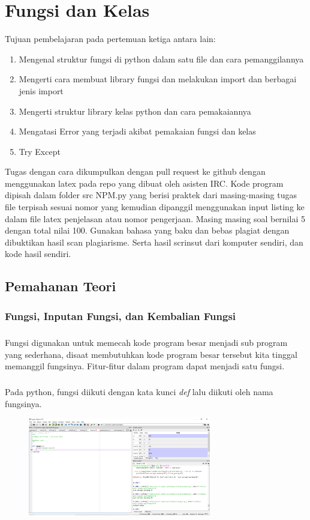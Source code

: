 \chapter{Fungsi dan Kelas}
Tujuan pembelajaran pada pertemuan ketiga antara lain:
\begin{enumerate}
\item
Mengenal struktur fungsi di python dalam satu file dan cara pemanggilannya
\item
Mengerti cara membuat library fungsi dan melakukan import dan berbagai jenis import
\item
Mengerti struktur library kelas python dan cara pemakaiannya
\item
Mengatasi Error yang terjadi akibat pemakaian fungsi dan kelas
\item
Try Except
\end{enumerate}
Tugas dengan cara dikumpulkan dengan pull request ke github dengan menggunakan latex pada repo yang dibuat oleh asisten IRC. Kode program dipisah dalam folder src NPM.py yang berisi praktek dari masing-masing tugas file terpisah sesuai nomor yang kemudian dipanggil menggunakan input listing ke dalam file latex penjelasan atau nomor pengerjaan. Masing masing soal bernilai 5 dengan total nilai 100. Gunakan bahasa yang baku dan bebas plagiat dengan dibuktikan hasil scan plagiarisme. Serta hasil scrinsut dari komputer sendiri, dan kode hasil sendiri.

\section{Pemahanan Teori}
\subsection{Fungsi, Inputan Fungsi, dan Kembalian Fungsi}
\paragraph{} 
    Fungsi digunakan untuk memecah kode program besar menjadi sub program yang sederhana, disaat membutuhkan kode program besar tersebut kita tinggal memanggil fungsinya. Fitur-fitur dalam program dapat menjadi satu fungsi.
\paragraph{}
    Pada python, fungsi diikuti dengan kata kunci \textit{def} lalu diikuti oleh nama fungsinya. 

\begin{figure}[h]
\centerline{\includegraphics[width=8cm]{figures/fungsi.PNG}}
\end{figure}
